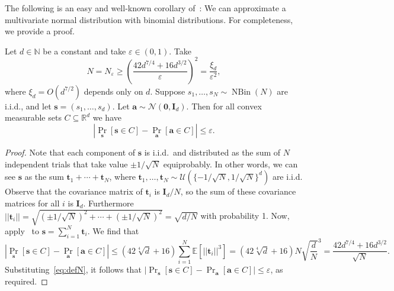 \documentclass[a4paper,11pt, DIV=11]{scrartcl}
\newcommand{\va}{\ensuremath{\mathbf{a}}}
\renewcommand{\epsilon}{\varepsilon}
\DeclareMathOperator{\NBin}{NBin}
\theoremstyle{plain}
\theoremstyle{definition}
\begin{document}
The following is an easy and well-known corollary of~: We can approximate a multivariate normal distribution with binomial distributions. For completeness, we provide a proof.

\begin{corollary}\label{corr:appliedBerryEsseen}
Let $d \in \mathbb{N}$ be a constant and take $\varepsilon \in (0, 1)$. Take
\begin{equation}\label{eq:defN}
N = N_\varepsilon \geq {\left(\frac{42 d^{7/4} +16 d^{3/2} }{\varepsilon}\right)}^2 = \frac{\xi_d}{\varepsilon^2},
\end{equation}
where $\xi_d = O(d^{7/2})$ depends only on $d$. Suppose
$s_1, \ldots, s_N \sim \NBin(N)$ are i.i.d., and let $\mathbf{s} = (s_1, \ldots, s_d)$.
 Let $\va \sim \mathcal{N}(\mathbf{0}, \mathbf{I}_d)$. Then for all convex measurable sets $C \subseteq \mathbb{R}^d$ we have
\[
| \Pr_{\mathbf{s}}[ \mathbf{s} \in C] - \Pr_{\va}[\va \in C] | \leq \varepsilon.
\]
\end{corollary}
\begin{proof}
Note that each component of $\mathbf{s}$ is i.i.d.~and distributed as the sum of $N$ independent trials that take value $\pm 1 / \sqrt{N}$ equiprobably. 
In other words, we can see
$\mathbf{s}$ as the sum $\mathbf{t}_1 + \cdots  + \mathbf{t}_N$, where $\mathbf{t}_1, \ldots, \mathbf{t}_N \sim \mathcal{U}({\{-1/\sqrt{N}, 1/\sqrt{N}\}}^d)$ are i.i.d.
Observe that the covariance matrix of $\mathbf{t}_i$ is $\mathbf{I}_d / N$, so the sum of these covariance matrices for all $i$ is $\mathbf{I}_d$. Furthermore $|| \mathbf{t}_i || = \sqrt{(\pm 1 / \sqrt{N})^2 + \cdots + (\pm 1 / \sqrt{N})^2 } = \sqrt{d / N}$ with probability 1.
Now, apply~ to $\mathbf{s} = \sum_{i = 1}^N \mathbf{t}_i$. We find that
    \[
    |\Pr_{\mathbf{s}}[\mathbf{s} \in C] - \Pr_\va[\va \in C]| \leq
    \left(42 \sqrt[4]{d} + 16\right)
    \sum_{i = 1}^N \mathbb{E}\left[ \left|\left| \mathbf{t}_i \right|\right|^3 \right]
    =
    \left(42 \sqrt[4]{d} + 16\right) N\sqrt{\frac{d}{N}}^3 = \frac{42 d^{7/4} + 16 d^{3/2}}{\sqrt{N}}.
    \]
    Substituting~\eqref{eq:defN}, it follows that $|\Pr_{\mathbf{s}}[ \mathbf{s} \in C] - \Pr_{\va}[\va \in C]| \leq \epsilon$, as required.
\end{proof}
\end{document}
